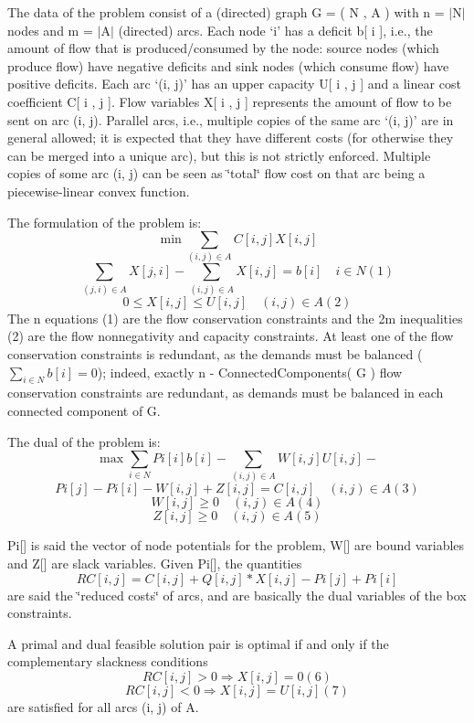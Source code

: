 The data of the problem consist of a (directed) graph G = ( N , A ) with n = $\vert$\+N$\vert$ nodes and m = $\vert$\+A$\vert$ (directed) arcs. Each node `i' has a deficit b\mbox{[} i \mbox{]}, i.\+e., the amount of flow that is produced/consumed by the node\+: source nodes (which produce flow) have negative deficits and sink nodes (which consume flow) have positive deficits. Each arc `(i, j)' has an upper capacity U\mbox{[} i , j \mbox{]} and a linear cost coefficient C\mbox{[} i , j \mbox{]}. Flow variables X\mbox{[} i , j \mbox{]} represents the amount of flow to be sent on arc (i, j). Parallel arcs, i.\+e., multiple copies of the same arc `(i, j)' are in general allowed; it is expected that they have different costs (for otherwise they can be merged into a unique arc), but this is not strictly enforced. Multiple copies of some arc (i, j) can be seen as \char`\"{}total\char`\"{} flow cost on that arc being a piecewise-\/linear convex function.

The formulation of the problem is\+: \[ \min \sum_{ (i, j) \in A } C[ i , j ] X[ i, j ] \] \[ \sum_{ (j, i) \in A } X[ j , i ] - \sum_{ (i, j) \in A } X[ i , j ] = b[ i ] \quad i \in N (1) \] \[ 0 \leq X[ i , j ] \leq U[ i , j ] \quad (i, j) \in A (2) \] The n equations (1) are the flow conservation constraints and the 2m inequalities (2) are the flow nonnegativity and capacity constraints. At least one of the flow conservation constraints is redundant, as the demands must be balanced ( $\sum_{ i \in N } b[ i ] = 0$); indeed, exactly n -\/ Connected\+Components( G ) flow conservation constraints are redundant, as demands must be balanced in each connected component of G.

The dual of the problem is\+: \[ \max \sum_{ i \in N } Pi[ i ] b[ i ] - \sum_{ (i, j) \in A } W[ i , j ] U[ i , j ] - \] \[ Pi[ j ] - Pi[ i ] - W[ i , j ] + Z[ i , j ] = C[ i , j ] \quad (i, j) \in A (3) \] \[ W[ i , j ] \geq 0 \quad (i, j) \in A (4) \] \[ Z[ i , j ] \geq 0 \quad (i, j) \in A (5) \]

Pi\mbox{[}\mbox{]} is said the vector of node potentials for the problem, W\mbox{[}\mbox{]} are bound variables and Z\mbox{[}\mbox{]} are slack variables. Given Pi\mbox{[}\mbox{]}, the quantities \[ RC[ i , j ] = C[ i , j ] + Q[ i , j ] * X[ i , j ] - Pi[ j ] + Pi[ i ] \] are said the \char`\"{}reduced costs\char`\"{} of arcs, and are basically the dual variables of the box constraints.

A primal and dual feasible solution pair is optimal if and only if the complementary slackness conditions \[ RC[ i , j ] > 0 \Rightarrow X[ i , j ] = 0 (6) \] \[ RC[ i , j ] < 0 \Rightarrow X[ i , j ] = U[ i , j ] (7) \] are satisfied for all arcs (i, j) of A. 

